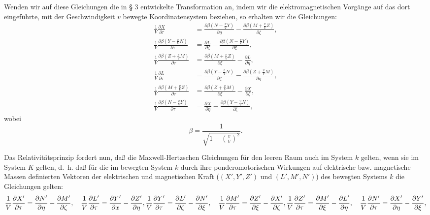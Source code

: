 \documentclass[17pt]{webarticle}       %
\begin{document}
Wenden wir auf diese Gleichungen die in § 3 entwickelte Transformation an, indem wir die elektromagnetischen Vorgänge auf das dort eingeführte, mit der Geschwindigkeit \( v \) bewegte Koordinatensystem beziehen, so erhalten wir die Gleichungen:
\[
\begin{align*}
\frac{1}{V} \frac{\partial X}{\partial \tau} &= \frac{\partial \beta \left( N - \frac{v}{V} Y \right)}{\partial \eta} - \frac{\partial \beta \left( M + \frac{v}{V} Z \right)}{\partial \zeta},
\\
\frac{1}{V} \frac{\partial \beta \left( Y - \frac{v}{V} N \right)}{\partial \tau} &= \frac{\partial L}{\partial \zeta} - \frac{\partial \beta \left( N - \frac{v}{V} Y \right)}{\partial \xi},
\\
\frac{1}{V} \frac{\partial \beta \left( Z + \frac{v}{V} M \right)}{\partial \tau} &= \frac{\partial \beta \left( M + \frac{v}{V} Z \right)}{\partial \xi} - \frac{\partial L}{\partial \eta},
\\
\frac{1}{V} \frac{\partial L}{\partial \tau} &= \frac{\partial \beta \left( Y - \frac{v}{V} N \right)}{\partial \zeta} - \frac{\partial \beta \left( Z + \frac{v}{V} M \right)}{\partial \eta},
\\
\frac{1}{V} \frac{\partial \beta \left( M + \frac{v}{V} Z \right)}{\partial \tau} &= \frac{\partial \beta \left( Z + \frac{v}{V} M \right)}{\partial \xi} - \frac{\partial X}{\partial \zeta},
\\
\frac{1}{V} \frac{\partial \beta \left( N - \frac{v}{V} Y \right)}{\partial \tau} &= \frac{\partial X}{\partial \eta} - \frac{\partial \beta \left( Y - \frac{v}{V} N \right)}{\partial \xi},
\end{align*} 
\]
wobei
\[
\beta = \frac{1}{\sqrt{1 - \left( \frac{v}{V} \right)^2}}.
\]

Das Relativitätsprinzip fordert nun, daß die Maxwell-Hertzschen Gleichungen für den leeren Raum auch im System \( k \) gelten, wenn sie im System \( K \) gelten, d.~h. daß für die im bewegten System \( k \) durch ihre ponderomotorischen Wirkungen auf elektrische bzw. magnetische Massen definierten Vektoren der elektrischen und magnetischen Kraft (\( (X', Y', Z') \) und \( (L', M', N') \)) des bewegten Systems \( k \) die Gleichungen gelten:
\[
\frac{1}{V} \frac{\partial X'}{\partial \tau} = \frac{\partial N'}{\partial \eta} - \frac{\partial M'}{\partial \zeta}, \quad \frac{1}{V} \frac{\partial L'}{\partial \tau} = \frac{\partial Y'}{\partial x} - \frac{\partial Z'}{\partial \eta},
\\
\frac{1}{V} \frac{\partial Y'}{\partial \tau} = \frac{\partial L'}{\partial \zeta} - \frac{\partial N'}{\partial \xi}, \quad \frac{1}{V} \frac{\partial M'}{\partial \tau} = \frac{\partial Z'}{\partial \xi} - \frac{\partial X'}{\partial \zeta},
\\
\frac{1}{V} \frac{\partial Z'}{\partial \tau} = \frac{\partial M'}{\partial \xi} - \frac{\partial L'}{\partial \eta}, \quad \frac{1}{V} \frac{\partial N'}{\partial \tau} = \frac{\partial X'}{\partial \eta} - \frac{\partial Y'}{\partial \xi},
\]
\end{document}
